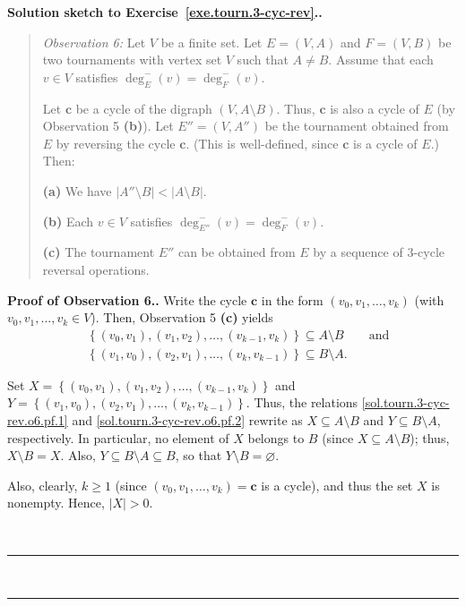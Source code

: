 \documentclass[numbers=enddot,12pt,final,onecolumn,notitlepage]{scrartcl}%
\theoremstyle{definition}
\newenvironment{statement}{\begin{quote}}{\end{quote}}
\newenvironment{proof}[1][Proof]{\noindent\textbf{#1.} }{\ \rule{0.5em}{0.5em}}
\newcommand{\set}[1]{\left\{ #1 \right\}}
\newcommand{\abs}[1]{\left| #1 \right|}
\newcommand{\tup}[1]{\left( #1 \right)}
\begin{document}
\begin{proof}[Solution sketch to Exercise~\ref{exe.tourn.3-cyc-rev}.]
\begin{statement}
\textit{Observation 6:} Let $V$ be a finite set. Let
$E = \tup{V, A}$ and $F = \tup{V, B}$ be
two tournaments with vertex set $V$ such that $A \neq B$.
Assume that each
$v \in V$ satisfies $\deg^-_E \tup{v} = \deg^-_F \tup{v}$.

Let $\mathbf{c}$ be a cycle of the digraph $\tup{V, A \setminus B}$.
Thus, $\mathbf{c}$ is also a cycle of $E$ (by
Observation 5 \textbf{(b)}).
Let $E'' = \tup{V, A''}$ be the tournament obtained from $E$ by
reversing the cycle $\mathbf{c}$. (This is well-defined,
since $\mathbf{c}$ is a cycle of $E$.) Then:

\textbf{(a)} We have $\abs{A'' \setminus B} < \abs{A \setminus B}$.

\textbf{(b)} Each $v \in V$ satisfies
$\deg^-_{E''} \tup{v} = \deg^-_F \tup{v}$.

\textbf{(c)} The tournament $E''$ can be obtained from $E$ by a
sequence of $3$-cycle reversal operations.
\end{statement}

\begin{proof}[Proof of Observation 6.]
Write the cycle $\mathbf{c}$ in the form
$\tup{v_0, v_1, \ldots, v_k}$ (with $v_0, v_1, \ldots, v_k \in V$).
Then, Observation 5 \textbf{(c)} yields
\begin{align}
& \set{\tup{v_0, v_1}, \tup{v_1, v_2}, \ldots,
       \tup{v_{k-1}, v_k}} \subseteq A \setminus B
\qquad \text{and}
\label{sol.tourn.3-cyc-rev.o6.pf.1}\\
& \set{\tup{v_1, v_0}, \tup{v_2, v_1}, \ldots,
       \tup{v_k, v_{k-1}}} \subseteq B \setminus A .
\label{sol.tourn.3-cyc-rev.o6.pf.2}
\end{align}

Set $X = \set{\tup{v_0, v_1}, \tup{v_1, v_2}, \ldots,
              \tup{v_{k-1}, v_k}}$
and $Y = \set{\tup{v_1, v_0}, \tup{v_2, v_1}, \ldots,
              \tup{v_k, v_{k-1}}}$.
Thus, the relations \eqref{sol.tourn.3-cyc-rev.o6.pf.1}
and \eqref{sol.tourn.3-cyc-rev.o6.pf.2} rewrite as
$X \subseteq A \setminus B$ and
$Y \subseteq B \setminus A$, respectively.
In particular, no element of $X$ belongs to $B$ (since
$X \subseteq A \setminus B$); thus, $X \setminus B = X$.
Also, $Y \subseteq B \setminus A \subseteq B$, so that
$Y \setminus B = \varnothing$.

Also, clearly, $k \geq 1$ (since
$\tup{v_0, v_1, \ldots, v_k} = \mathbf{c}$ is a cycle),
and thus the set $X$ is nonempty. Hence, $\abs{X} > 0$.


\end{proof}
\end{proof}
\end{document}
